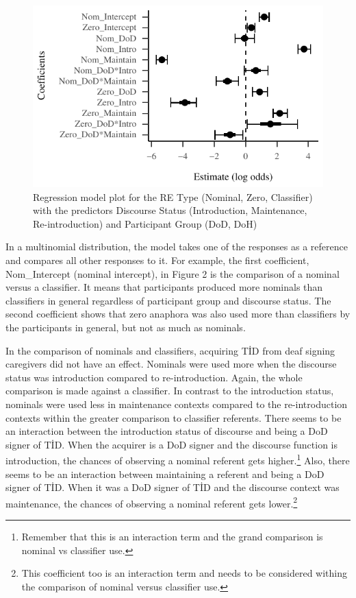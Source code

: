 \documentclass[review]{elsarticle} %
\begin{document}
\begin{figure}
\centering
\includegraphics{revised_manuscript_files/figure-latex/model-gram-1.pdf}
\caption{Regression model plot for the RE Type (Nominal, Zero,
Classifier) with the predictors Discourse Status (Introduction,
Maintenance, Re-introduction) and Participant Group (DoD, DoH)}
\end{figure}

In a multinomial distribution, the model takes one of the responses as a
reference and compares all other responses to it. For example, the first
coefficient, Nom\_Intercept (nominal intercept), in Figure 2 is the
comparison of a nominal versus a classifier. It means that participants
produced more nominals than classifiers in general regardless of
participant group and discourse status. The second coefficient shows
that zero anaphora was also used more than classifiers by the
participants in general, but not as much as nominals.

In the comparison of nominals and classifiers, acquiring TİD from deaf
signing caregivers did not have an effect. Nominals were used more when
the discourse status was introduction compared to re-introduction.
Again, the whole comparison is made against a classifier. In contrast to
the introduction status, nominals were used less in maintenance contexts
compared to the re-introduction contexts within the greater comparison
to classifier referents. There seems to be an interaction between the
introduction status of discourse and being a DoD signer of TİD. When the
acquirer is a DoD signer and the discourse function is introduction, the
chances of observing a nominal referent gets
higher.\footnote{Remember that this is an interaction term and the grand comparison is nominal vs classifier use.}
Also, there seems to be an interaction between maintaining a referent
and being a DoD signer of TİD. When it was a DoD signer of TİD and the
discourse context was maintenance, the chances of observing a nominal
referent gets
lower.\footnote{This coefficient too is an interaction term and needs to be considered withing the comparison of nominal versus classifier use.}
\end{document}
